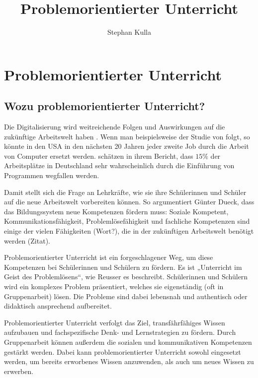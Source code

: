 \documentclass[jour,12pt,a4paper]{apa6}
\title{Problemorientierter Unterricht}
\author{Stephan Kulla}
\affiliation{TU München}
\begin{document}
\maketitle

\section{Problemorientierter Unterricht}

\subsection{Wozu problemorientierter Unterricht?}

Die Digitalisierung wird weitreichende Folgen und Auswirkungen auf die zukünftige Arbeitswelt haben \parencite{dengler2015}. Wenn man beispielsweise der Studie von \textcite{frey2017} folgt, so könnte in den USA in den nächsten 20 Jahren jeder zweite Job durch die Arbeit von Computer ersetzt werden. \cite{dengler2015} schätzen in ihrem Bericht, dass $15\%$ der Arbeitsplätze in Deutschland sehr wahrscheinlich durch die Einführung von Programmen wegfallen werden.

Damit stellt sich die Frage an Lehrkräfte, wie sie ihre Schülerinnen und Schüler auf die neue Arbeitswelt vorbereiten können. So argumentiert Günter Dueck, dass das Bildungssystem neue Kompetenzen fördern muss: Soziale Kompetent, Kommunikationsfähigkeit, Problemlösefähigkeit und fachliche Kompetenzen sind einige der vielen Fähigkeiten (Wort?), die in der zukünftigen Arbeitswelt benötigt werden (Zitat).

Problemorientierter Unterricht ist ein forgeschlagener Weg, um diese Kompetenzen bei Schülerinnen und Schülern zu fördern\cite{silver2004}. Es ist „Unterricht im Geist des Problemlösens“, wie Reusser es beschreibt\cite{reusser2005}. Schülerinnen und Schülern wird ein komplexes Problem präsentiert, welches sie eigenständig (oft in Gruppenarbeit) lösen\cite{silver2004}. Die Probleme sind dabei lebensnah und authentisch \cite{kunter2013} oder didaktisch ansprechend aufbereitet\cite{reusser2005}.

Problemorientierter Unterricht verfolgt das Ziel, transfährfähiges Wissen aufzubauen und fachspezifische Denk- und Lernstrategien zu fördern\cite{reusser2005}. Durch Gruppenarbeit können außerdem die sozialen und kommunikativen Kompetenzen gestärkt werden\cite{seidel2014}. Dabei kann problemorientierter Unterricht sowohl eingesetzt werden, um bereits erworbenes Wissen anzuwenden, als auch um neues Wissen zu erwerben\cite{reusser2005}.
\end{document}
